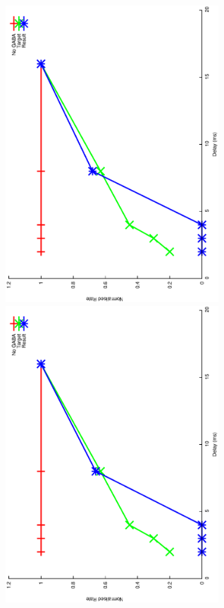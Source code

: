 \documentclass{article}
\begin{document}
\includegraphics[keepaspectratio=true,angle=-90,width=0.6\textwidth]{DS_ClickRecovery_result.16.eps}\clearpage
\includegraphics[keepaspectratio=true,angle=-90,width=0.6\textwidth]{DS_ClickRecovery_result.17.eps}\clearpage
\end{document}
